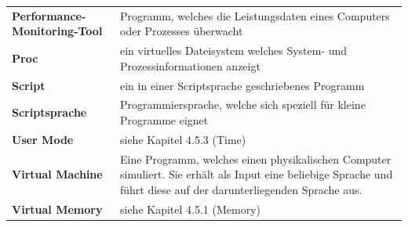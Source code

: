 \documentclass{fancydocument}
\begin{document}
\begin{tabularx}{\linewidth}{p{6.5cm}X}
\textbf{Performance-Monitoring-Tool}&Programm, welches die Leistungsdaten eines Computers oder Prozesses überwacht\\
\textbf{Proc}&ein virtuelles Dateisystem welches System- und Prozessinformationen anzeigt\\
\textbf{Script}&ein in einer Scriptsprache geschriebenes Programm\\
\textbf{Scriptsprache}&Programmiersprache, welche sich speziell für kleine Programme eignet\\
\textbf{User Mode}&siehe Kapitel 4.5.3 (Time)\\
\textbf{Virtual Machine}&Eine Programm, welches einen physikalischen Computer simuliert. Sie erhält als Input eine beliebige Sprache und führt
diese auf der darunterliegenden Sprache aus.\\
\textbf{Virtual Memory}&siehe Kapitel 4.5.1 (Memory)\\
\end{tabularx}
\end{document}
